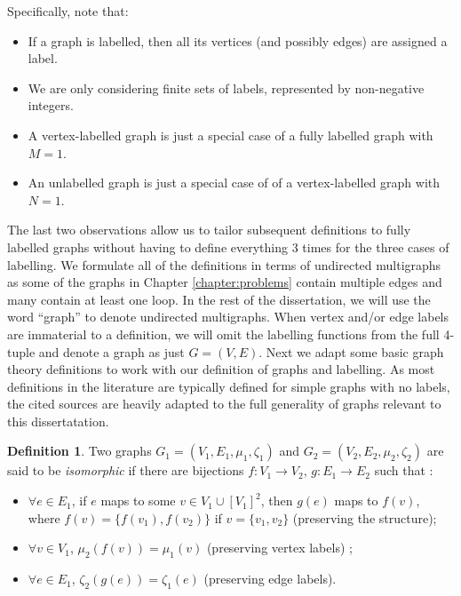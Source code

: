 \documentclass{l4proj}
\theoremstyle{definition}
\newtheorem{definition}{Definition}[chapter]
\theoremstyle{remark}
\begin{document}
Specifically, note that:

\begin{itemize} %
\item If a graph is labelled, then all its vertices (and possibly edges) are
  assigned a label.
\item We are only considering finite sets of labels, represented by non-negative
  integers.
\item A vertex-labelled graph is just a special case of a fully labelled graph
  with $M = 1$.
\item An unlabelled graph is just a special case of of a vertex-labelled graph
  with $N = 1$.
\end{itemize}

The last two observations allow us to tailor subsequent definitions to fully
labelled graphs without having to define everything 3 times for the three cases
of labelling. We formulate all of the definitions in terms of undirected
multigraphs as some of the graphs in Chapter \ref{chapter:problems} contain
multiple edges and many contain at least one loop. In the rest of the
dissertation, we will use the word ``graph'' to denote undirected multigraphs.
When vertex and/or edge labels are immaterial to a definition, we will omit the
labelling functions from the full 4-tuple and denote a graph as just $G = (V,
E)$. Next we adapt some basic graph theory definitions to work with our
definition of graphs and labelling. As most definitions in the literature are
typically defined for simple graphs with no labels, the cited sources are
heavily adapted to the full generality of graphs relevant to this
dissertatation.

\begin{definition}
  Two graphs $G_1 = (V_1, E_1, \mu_1, \zeta_1)$ and $G_2 = (V_2, E_2, \mu_2,
  \zeta_2)$ are said to be \emph{isomorphic} if there are bijections $f \colon
  V_1 \to V_2$, $g \colon E_1 \to E_2$ such that
  \cite{DBLP:journals/jcamd/RaymondW02a}:
  \begin{itemize}
  \item $\forall e \in E_1$, if $e$ maps to some $v \in V_1 \cup [V_1]^2$, then
    $g(e)$ maps to $f(v)$, where $f(v) = \{ f(v_1), f(v_2) \}$ if $v = \{ v_1,
    v_2 \}$ (preserving the structure);
  \item $\forall v \in V_1$, $\mu_2(f(v)) = \mu_1(v)$ (preserving vertex labels)
    \cite{DBLP:journals/siamcomp/BabaiES80};
  \item $\forall e \in E_1$, $\zeta_2(g(e)) = \zeta_1(e)$ (preserving edge
    labels).
  \end{itemize}
\end{definition}
\end{document}
